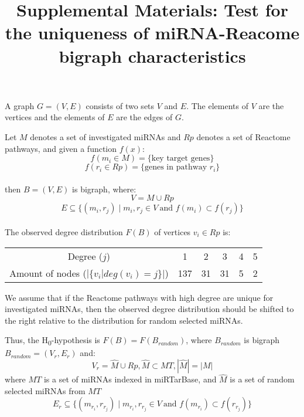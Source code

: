 \documentclass[a4paper, 12pt]{article}
\title{Supplemental Materials: Test for the uniqueness of miRNA-Reacome bigraph characteristics}
\date{}
\begin{document}
\maketitle

A graph $G = (V, E)$ consists of two sets $V$ and $E$. The elements of $V$ are the vertices and the elements of $E$ are the edges of $G$.

Let $M$ denotes a set of investigated miRNAs and $Rp$ denotes a set of Reactome pathways, and given a function $f(x)$:
\begin{displaymath}
f(m_{i} \in M)=\{\text{key target genes}\}
\end{displaymath}
\begin{displaymath}
f(r_{i} \in Rp)=\{\text{genes in pathway } r_{i}\}
\end{displaymath}
\\then $B=(V,E)$ is bigraph, where:
\begin{displaymath}
V=M \cup Rp
\end{displaymath}
\begin{displaymath}
E \subseteq \{(m_{i},r_{j}) \mid m_{i},r_{j} \in V\ \text{and } f(m_{i}) \subset f(r_{j})\}
\end{displaymath}
\\The observed degree distribution $F(B)$ of vertices $v_{i}\in Rp$ is:

\begin{center}
	\begin{tabular}{ |c|c|c|c|c|c| } 
		\hline
		Degree ($j$)& 1 & 2 & 3 & 4 & 5 \\ 
		Amount of nodes ($|\{v_{i} | deg(v_{i})=j\}|$)& 137 & 31 & 31 & 5 & 2 \\
		\hline
	\end{tabular}
\end{center}

We assume that if the Reactome pathways with high degree are unique for investigated miRNAs, then the observed degree distribution should be shifted to the right relative to the distribution for random selected miRNAs.

Thus, the H\textsubscript{0}-hypothesis is $F(B)=F(B_{random})$, where $B_{random}$ is bigraph $B_{random}=(V_{r},E_{r})$ and:
\begin{displaymath}
	V_{r}=\hat M \cup Rp, \hat M \subset MT, |\hat M| = |M|
\end{displaymath}
where $MT$ is a set of miRNAs indexed in miRTarBase, and $\hat M$ is a set of random selected miRNAs from $MT$
\begin{displaymath}
	E_{r} \subseteq \{(m_{r_{i}},r_{r_{j}}) \mid m_{r_{i}},r_{r_{j}} \in V\ \text{and } f(m_{r_{i}}) \subset f(r_{r_{j}})\}
\end{displaymath}
\end{document}
